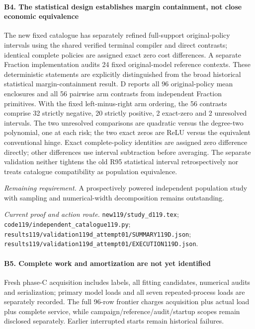 \paragraph{B4. The statistical design establishes margin containment, not close economic equivalence}

The new fixed catalogue has separately refined full-support original-policy intervals using the shared verified terminal compiler and direct contrasts; identical complete policies are assigned exact zero cost differences. A separate Fraction implementation audits 24 fixed original-model reference contexts. These deterministic statements are explicitly distinguished from the broad historical statistical margin-containment result. D reports all 96 original-policy mean enclosures and all 56 pairwise arm contrasts from independent Fraction primitives. With the fixed left-minus-right arm ordering, the 56 contrasts comprise 32 strictly negative, 20 strictly positive, 2 exact-zero and 2 unresolved intervals. The two unresolved comparisons are quadratic versus the degree-two polynomial, one at each risk; the two exact zeros are ReLU versus the equivalent conventional hinge. Exact complete-policy identities are assigned zero difference directly; other differences use interval subtraction before averaging. The separate validation neither tightens the old R95 statistical interval retrospectively nor treats catalogue compatibility as population equivalence.

\par\emph{Remaining requirement.} A prospectively powered independent population study with sampling and numerical-width decomposition remains outstanding.

\par\emph{Current proof and action route.} \nolinkurl{new119/study_d119.tex}; \nolinkurl{code119/independent_catalogue119.py}; \nolinkurl{results119/validation119d_attempt01/SUMMARY119D.json}; \nolinkurl{results119/validation119d_attempt01/EXECUTION119D.json}.

\paragraph{B5. Complete work and amortization are not yet identified}

Fresh phase-C acquisition includes labels, all fitting candidates, numerical audits and serialization; primary model loads and all seven repeated-process loads are separately recorded. The full 96-row frontier charges acquisition plus actual load plus complete service, while campaign/\allowbreak{}reference/\allowbreak{}audit/\allowbreak{}startup scopes remain disclosed separately. Earlier interrupted starts remain historical failures.


